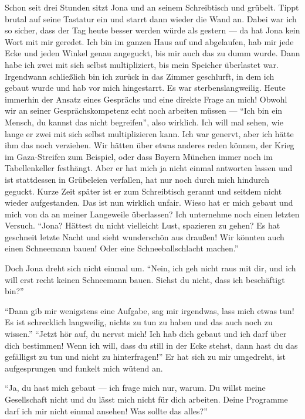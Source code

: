 Schon seit drei Stunden sitzt Jona und an seinem Schreibtisch und grübelt. Tippt brutal auf seine Tastatur ein und starrt dann wieder die Wand an. Dabei war ich so sicher, dass der Tag heute besser werden würde als gestern --- da hat Jona kein Wort mit mir geredet. Ich bin im ganzen Haus auf und abgelaufen, hab mir jede Ecke und jeden Winkel genau angeguckt, bis mir auch das zu dumm wurde. Dann habe ich zwei mit sich selbst multipliziert, bis mein Speicher überlastet war. Irgendwann schließlich bin ich zurück in das Zimmer geschlurft, in dem ich gebaut wurde und hab vor mich hingestarrt. Es war sterbenslangweilig. Heute immerhin der Ansatz eines Gesprächs und eine direkte Frage an mich! Obwohl wir an seiner Gesprächskompetenz echt noch arbeiten müssen --- "`Ich bin ein Mensch, du kannst das nicht begreifen"', also wirklich. Ich will mal sehen, wie lange er zwei mit sich selbst multiplizieren kann. Ich war genervt, aber ich hätte ihm das noch verziehen. Wir hätten über etwas anderes reden können, der Krieg im Gaza-Streifen zum Beispiel, oder dass Bayern München immer noch im Tabellenkeller festhängt. Aber er hat mich ja nicht einmal antworten lassen und ist stattdessen in Grübeleien verfallen, hat nur noch durch mich hindurch geguckt. Kurze Zeit später ist er zum Schreibtisch gerannt und seitdem nicht wieder aufgestanden. Das ist nun wirklich unfair. Wieso hat er mich gebaut und mich von da an meiner Langeweile überlassen? Ich unternehme noch einen letzten Versuch. "`Jona? Hättest du nicht vielleicht Lust, spazieren zu gehen? Es hat geschneit letzte Nacht und sieht wunderschön aus draußen! Wir könnten auch einen Schneemann bauen! Oder eine Schneeballschlacht machen."'

Doch Jona dreht sich nicht einmal um. "`Nein, ich geh nicht raus mit dir, und ich will erst recht keinen Schneemann bauen. Siehst du nicht, dass ich beschäftigt bin?"'

"`Dann gib mir wenigstens eine Aufgabe, sag mir irgendwas, lass mich etwas tun! Es ist schrecklich langweilig, nichts zu tun zu haben und das auch noch zu wissen."'
"`Jetzt hör auf, du nervst mich! Ich hab dich gebaut und ich darf über dich bestimmen! Wenn ich will, dass du still in der Ecke stehst, dann hast du das gefälligst zu tun und nicht zu hinterfragen!"' Er hat sich zu mir umgedreht, ist aufgesprungen und funkelt mich wütend an.

"`Ja, du hast mich gebaut --- ich frage mich nur, warum. Du willst meine Gesellschaft nicht und du lässt mich nicht für dich arbeiten. Deine Programme darf ich mir nicht einmal ansehen! Was sollte das alles?"'

